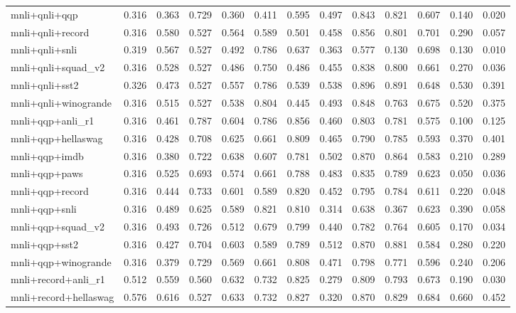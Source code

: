 \begin{table}[t]
\begin{tabular}{lrrrrrrrrrrrr}
    mnli+qnli+qqp & 0.316 & 0.363 & 0.729 & 0.360 & 0.411 & 0.595 & 0.497 & 0.843 & 0.821 & 0.607 & 0.140 & 0.020 \\
    mnli+qnli+record & 0.316 & 0.580 & 0.527 & 0.564 & 0.589 & 0.501 & 0.458 & 0.856 & 0.801 & 0.701 & 0.290 & 0.057 \\
    mnli+qnli+snli & 0.319 & 0.567 & 0.527 & 0.492 & 0.786 & 0.637 & 0.363 & 0.577 & 0.130 & 0.698 & 0.130 & 0.010 \\
    mnli+qnli+squad\_v2 & 0.316 & 0.528 & 0.527 & 0.486 & 0.750 & 0.486 & 0.455 & 0.838 & 0.800 & 0.661 & 0.270 & 0.036 \\
    mnli+qnli+sst2 & 0.326 & 0.473 & 0.527 & 0.557 & 0.786 & 0.539 & 0.538 & 0.896 & 0.891 & 0.648 & 0.530 & 0.391 \\
    mnli+qnli+winogrande & 0.316 & 0.515 & 0.527 & 0.538 & 0.804 & 0.445 & 0.493 & 0.848 & 0.763 & 0.675 & 0.520 & 0.375 \\
    mnli+qqp+anli\_r1 & 0.316 & 0.461 & 0.787 & 0.604 & 0.786 & 0.856 & 0.460 & 0.803 & 0.781 & 0.575 & 0.100 & 0.125 \\
    mnli+qqp+hellaswag & 0.316 & 0.428 & 0.708 & 0.625 & 0.661 & 0.809 & 0.465 & 0.790 & 0.785 & 0.593 & 0.370 & 0.401 \\
    mnli+qqp+imdb & 0.316 & 0.380 & 0.722 & 0.638 & 0.607 & 0.781 & 0.502 & 0.870 & 0.864 & 0.583 & 0.210 & 0.289 \\
    mnli+qqp+paws & 0.316 & 0.525 & 0.693 & 0.574 & 0.661 & 0.788 & 0.483 & 0.835 & 0.789 & 0.623 & 0.050 & 0.036 \\
    mnli+qqp+record & 0.316 & 0.444 & 0.733 & 0.601 & 0.589 & 0.820 & 0.452 & 0.795 & 0.784 & 0.611 & 0.220 & 0.048 \\
    mnli+qqp+snli & 0.316 & 0.489 & 0.625 & 0.589 & 0.821 & 0.810 & 0.314 & 0.638 & 0.367 & 0.623 & 0.390 & 0.058 \\
    mnli+qqp+squad\_v2 & 0.316 & 0.493 & 0.726 & 0.512 & 0.679 & 0.799 & 0.440 & 0.782 & 0.764 & 0.605 & 0.170 & 0.034 \\
    mnli+qqp+sst2 & 0.316 & 0.427 & 0.704 & 0.603 & 0.589 & 0.789 & 0.512 & 0.870 & 0.881 & 0.584 & 0.280 & 0.220 \\
    mnli+qqp+winogrande & 0.316 & 0.379 & 0.729 & 0.569 & 0.661 & 0.808 & 0.471 & 0.798 & 0.771 & 0.596 & 0.240 & 0.206 \\
    mnli+record+anli\_r1 & 0.512 & 0.559 & 0.560 & 0.632 & 0.732 & 0.825 & 0.279 & 0.809 & 0.793 & 0.673 & 0.190 & 0.030 \\
    mnli+record+hellaswag & 0.576 & 0.616 & 0.527 & 0.633 & 0.732 & 0.827 & 0.320 & 0.870 & 0.829 & 0.684 & 0.660 & 0.452 \\

\end{tabular}
\end{table}
